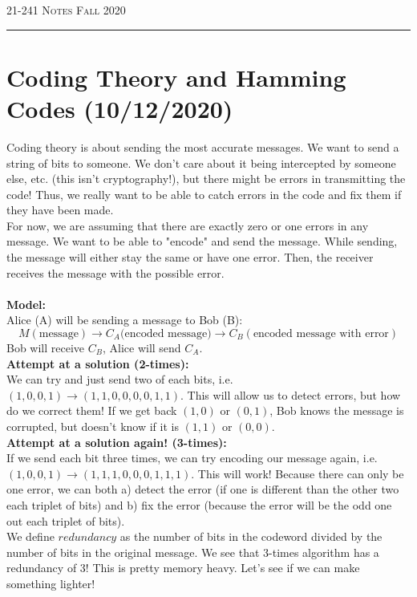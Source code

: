 \documentclass[12pt]{amsart}
\begin{document}
\thispagestyle{empty}

{\scshape 21-241} \hfill {\scshape \Large Notes} \hfill {\scshape Fall 2020}
\medskip
\hrule
\bigskip

\section*{Coding Theory and Hamming Codes (10/12/2020)}
Coding theory is about sending the most accurate messages. We want to send a string of bits to someone. We don't care about it being intercepted by someone else, etc. (this isn't cryptography!), but there might be errors in transmitting the code! Thus, we really want to be able to catch errors in the code and fix them if they have been made.\\
For now, we are assuming that there are exactly zero or one errors in any message. We want to be able to "encode" and send the message. While sending, the message will either stay the same or have one error. Then, the receiver receives the message with the possible error.\\
\\
\textbf{Model:}\\
Alice (A) will be sending a message to Bob (B):
\[M (\text{message}) \rightarrow C_A (\text{encoded message)} \rightarrow C_B (\text{encoded message with error})\]
Bob will receive $C_B$, Alice will send $C_A$.\\

\textbf{Attempt at a solution (2-times):}\\
We can try and just send two of each bits, i.e. $(1,0,0,1) \rightarrow (1,1,0,0,0,0,1,1)$. This will allow us to detect errors, but how do we correct them! If we get back $(1, 0)$ or $(0, 1)$, Bob knows the message is corrupted, but doesn't know if it is $(1, 1)$ or $(0, 0)$.\\

\textbf{Attempt at a solution again! (3-times):}\\
If we send each bit three times, we can try encoding our message again, i.e. $(1,0,0,1) \rightarrow (1,1,1,0,0,0,1,1,1)$. This will work! Because there can only be one error, we can both a) detect the error (if one is different than the other two each triplet of bits) and b) fix the error (because the error will be the odd one out each triplet of bits).\\
We define $redundancy$ as the number of bits in the codeword divided by the number of bits in the original message. We see that 3-times algorithm has a redundancy of 3! This is pretty memory heavy. Let's see if we can make something lighter!
\\
\end{document}
